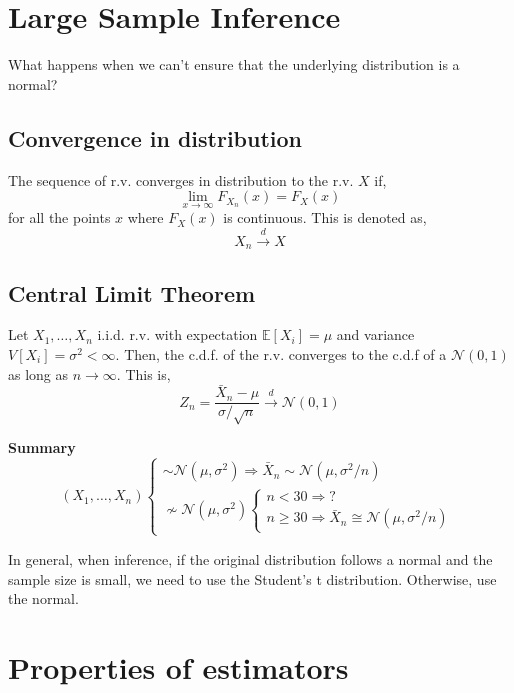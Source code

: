 \section{Large Sample Inference}
What happens when we can't ensure that the underlying distribution is a normal?

\subsection{Convergence in distribution}
The sequence of r.v. converges in distribution to the r.v. $X$ if,
\[ \lim_{x\rightarrow\infty}F_{X_n}(x) = F_X(x) \] for all the points $x$ where
$F_X(x)$ is continuous. This is denoted as,
\[ X_n \xrightarrow{d} X \]  

\subsection{Central Limit Theorem}
Let $X_1,\dots,X_n$ i.i.d. r.v. with expectation $\mathbb{E}[X_i] = \mu$ and
variance $V[X_i]=\sigma^2 < \infty$. Then, the c.d.f. of the r.v. converges to
the c.d.f of a $\mathcal{N}(0,1)$ as long as $n \rightarrow \infty$. This is,
\[ Z_n = \frac{\bar{X}_n - \mu}{\sigma/\sqrt{n}} \xrightarrow{d}
\mathcal{N}(0,1)\]

\begin{tcolorbox}
    \textbf{Summary}\\
    \[
    (X_1,\dots,X_n)
    \begin{cases}
        \sim \mathcal{N}(\mu, \sigma^2) \Rightarrow \bar{X}_n \sim \mathcal{N}(\mu, \sigma^2/n)\\
        \nsim \mathcal{N}(\mu, \sigma^2)
            \begin{cases}
                n < 30 \Rightarrow \text{?}\\
                n \geq 30 \Rightarrow \bar{X}_n \cong \mathcal{N}(\mu, \sigma^2/n)
            \end{cases}
    \end{cases}
    \]
\end{tcolorbox}
In general, when inference, if the original distribution follows a normal and
the sample size is small, we need to use the Student's t distribution.
Otherwise, use the normal. 


\section{Properties of estimators}
